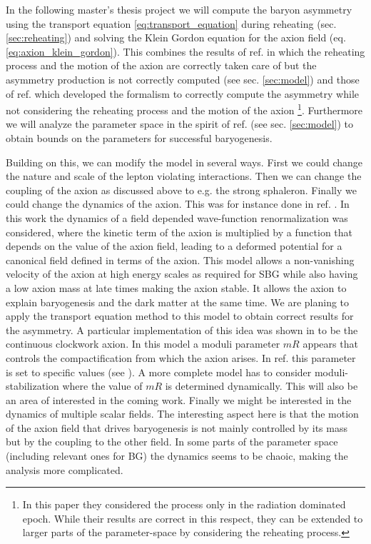 \documentclass[13pt,a4paper,titlepage]{article}
\begin{document}
In the following master's thesis project we will compute the baryon asymmetry using the transport equation \eqref{eq:transport_equation} during reheating (sec. \ref{sec:reheating}) and
solving the Klein Gordon equation for the axion field (eq. \eqref{eq:axion_klein_gordon}).
This combines the results of ref. \cite{Axion_leptogenesis_Kusenko_2015} in which the reheating process and the motion of the axion are correctly taken care of but the asymmetry production
is not correctly computed (see sec. \ref{sec:model}) and those of
ref. \cite{Domcke:2020kcp_Generic_Couplings} which developed the formalism to correctly compute
the asymmetry while not considering the reheating process and the motion of the
axion \footnote{In this paper they considered the process only in the radiation dominated epoch. While their results are correct in this respect, they can be extended to larger parts of the parameter-space by considering the reheating process.}.
Furthermore we will analyze the parameter space in the spirit of ref. \cite{Axion_leptogenesis_Kusenko_2015} (see sec. \ref{sec:model}) to obtain bounds
on the parameters for successful baryogenesis.

Building on this, we can modify the model in several ways.
First we could change the nature and scale of the lepton violating interactions.
Then we can change the coupling of the axion as discussed above to e.g. the strong sphaleron.
Finally we could change the dynamics of the axion. This was for instance done in ref. \cite{Deformed_potential_Bae_2019}.
In this work the dynamics of a field depended wave-function renormalization was considered,
where the kinetic term of the axion is multiplied by a function that depends on the value of
the axion field, leading to a deformed potential for a canonical field defined in terms of
the axion.
This model allows a non-vanishing velocity of the axion at high energy scales as required for
SBG while also having a low axion mass at late times making the axion stable.
It allows the axion to explain baryogenesis and the dark matter at the same time.
We are planing to apply the transport equation method to this model to obtain correct results
for the asymmetry. A particular implementation of this idea was shown in \cite[sec III]{Deformed_potential_Bae_2019} to be the continuous clockwork axion.
In this model a moduli parameter $mR$ appears that controls the compactification from which the
axion arises. In ref. \cite{Deformed_potential_Bae_2019} this parameter is
set to specific values (see \cite[fig. 2]{Deformed_potential_Bae_2019}).
A more complete model has to consider moduli-stabilization where the value of $mR$ is determined dynamically. This will also be an area of interested in the coming work.
Finally we might be interested in the dynamics of multiple scalar fields.
The interesting aspect here is that the motion of the axion field that drives baryogenesis
is not mainly controlled by its mass but by the coupling to the other field. In some parts of
the parameter space (including relevant ones for BG) the dynamics seems to be chaoic, making
the analysis more complicated.
\end{document}
